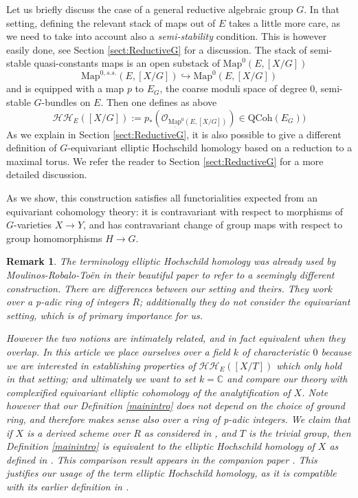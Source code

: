 \documentclass[11pt,letterpaper]{amsart}
\newtheorem{remark}[dummy]{Remark}
\newcommand{\Mapo}[2]{\underline{\mathrm{Map}}^{0}\left (#1,#2\right )}
\newcommand{\QCoh}{\mathrm{QCoh}}
\begin{document}
Let us briefly discuss the case of a general reductive algebraic group $G$. In that setting, 
defining the relevant stack of maps out of $E$ takes a little more care, as we need to take into account also a \emph{semi-stability} condition. This is however easily done, see Section \ref{sect:ReductiveG} for a discussion. The stack of semi-stable quasi-constants maps is an open substack of $\mathrm{Map}^{0}(E,[X/G])$
$$
\mathrm{Map}^{0,s.s.}(E,[X/G])\hookrightarrow\mathrm{Map}^{0}(E,[X/G])
$$
and is equipped with a map $p$ to $E_G$, the coarse moduli space of degree $0$, semi-stable $G$-bundles on $E$. 
Then one defines as above 
$$
\mathcal{HH}_E([X/G]):=p_*(\mathcal{O}_{\Mapo{E}{[X/G]}}) \in \QCoh(E_G)
)
$$
As we explain in Section \ref{sect:ReductiveG}, it is also possible to give a different definition of $G$-equivariant elliptic Hochschild homology based on a reduction to a maximal torus. We refer the reader to  Section \ref{sect:ReductiveG}  for a more detailed discussion.


As we show, this construction satisfies all functorialities expected from an equivariant cohomology theory: it is contravariant with respect to morphisms of $G$-varieties $X\to Y$, and has contravariant change of group maps with respect to group homomorphisms $H\to G$.

\begin{remark}
The terminology \emph{elliptic Hochschild homology} was already used by Moulinos-Robalo-To\"en in their beautiful  paper \cite{MRT} to refer to a seemingly different construction. There are differences between our setting  and theirs. They work over a p-adic ring of integers $R$; additionally they do not consider the equivariant setting, which is of primary importance for us. 

However the two notions are intimately related, and in fact equivalent when they overlap. 
 In this article we place ourselves over a field $k$ of characteristic $0$ because we are interested in establishing properties of $\mathcal{HH}_E([X/T])$ which only hold in that setting; and ultimately we want to set $k=\mathbb{C}$ and compare our theory with complexified equivariant elliptic cohomology of the analytification of $X$.  Note however that our Definition \ref{mainintro} does not depend on the choice of ground ring, and therefore makes  sense also over a ring of p-adic integers.  We claim  that if $X$ is a derived scheme over $R$ as considered in \cite{MRT}, and $T$ is the trivial group, then Definition \ref{mainintro} is equivalent to the elliptic Hochschild homology of $X$ as defined in \cite{MRT}. This comparison result  appears in the companion paper \cite{SST}. This justifies our usage of the term \emph{elliptic Hochschild homology}, as it is compatible with its earlier definition in  \cite{MRT}.
\end{remark}
\end{document}
